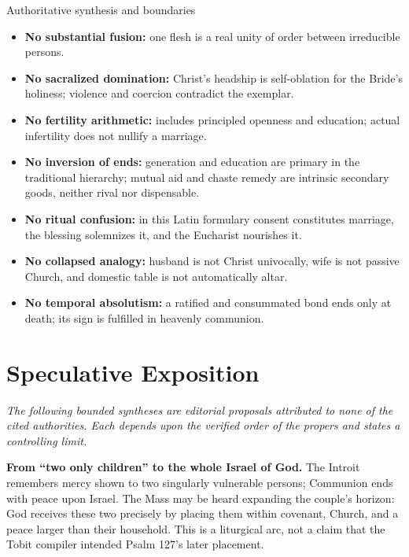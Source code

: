 \begin{deepstudy}
\begin{studybox}{Authoritative synthesis and boundaries}
\begin{itemize}[topsep=0pt,itemsep=0.2em,parsep=0pt]
\item \textbf{No substantial fusion:} one flesh is a real unity of order between irreducible persons.
\item \textbf{No sacralized domination:} Christ's headship is self-oblation for the Bride's holiness; violence and coercion contradict the exemplar.
\item \textbf{No fertility arithmetic:}  includes principled openness and education; actual infertility does not nullify a marriage.
\item \textbf{No inversion of ends:} generation and education are primary in the traditional hierarchy; mutual aid and chaste remedy are intrinsic secondary goods, neither rival nor dispensable.
\item \textbf{No ritual confusion:} in this Latin formulary consent constitutes marriage, the blessing solemnizes it, and the Eucharist nourishes it.
\item \textbf{No collapsed analogy:} husband is not Christ univocally, wife is not passive Church, and domestic table is not automatically altar.
\item \textbf{No temporal absolutism:} a ratified and consummated bond ends only at death; its sign is fulfilled in heavenly communion.
\end{itemize}
\end{studybox}

\section*{Speculative Exposition}

\noindent\emph{The following bounded syntheses are editorial proposals attributed to none of the cited authorities. Each depends upon the verified order of the propers and states a controlling limit.}

\noindent\textbf{From ``two only children'' to the whole Israel of God.\enspace{}}
The Introit remembers mercy shown to two singularly vulnerable persons; Communion ends with peace upon Israel. The Mass may be heard expanding the couple's horizon: God receives these two precisely by placing them within covenant, Church, and a peace larger than their household. This is a liturgical arc, not a claim that the Tobit compiler intended Psalm 127's later placement.


\end{deepstudy}
